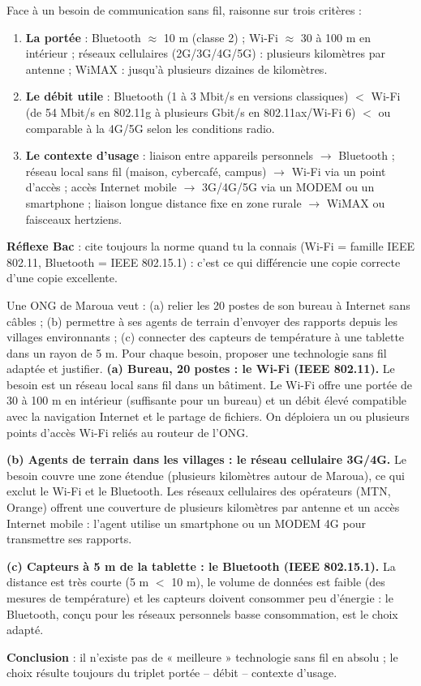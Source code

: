 \documentclass[11pt]{article}
\newcommand{\cle}[1]{{\popxbold\color{popdark}#1}}
\begin{document}
\begin{methode}
Face à un besoin de communication sans fil, raisonne sur trois critères :
\begin{enumerate}
\item \textbf{La portée} : Bluetooth $\approx$ 10 m (classe 2) ; Wi-Fi $\approx$ 30 à 100 m en intérieur ; réseaux cellulaires (2G/3G/4G/5G) : plusieurs kilomètres par antenne ; WiMAX : jusqu'à plusieurs dizaines de kilomètres.
\item \textbf{Le débit utile} : Bluetooth (1 à 3 Mbit/s en versions classiques) $<$ Wi-Fi (de 54 Mbit/s en 802.11g à plusieurs Gbit/s en 802.11ax/Wi-Fi 6) $<$ ou comparable à la 4G/5G selon les conditions radio.
\item \textbf{Le contexte d'usage} : liaison entre appareils personnels $\rightarrow$ Bluetooth ; réseau local sans fil (maison, cybercafé, campus) $\rightarrow$ Wi-Fi via un point d'accès ; accès Internet mobile $\rightarrow$ 3G/4G/5G via un MODEM ou un smartphone ; liaison longue distance fixe en zone rurale $\rightarrow$ WiMAX ou faisceaux hertziens.
\end{enumerate}
\textbf{Réflexe Bac} : cite toujours la norme quand tu la connais (Wi-Fi = famille IEEE 802.11, Bluetooth = IEEE 802.15.1) : c'est ce qui différencie une copie correcte d'une copie excellente.
\end{methode}

\begin{exoresolu}
Une ONG de Maroua veut : (a) relier les 20 postes de son bureau à Internet sans câbles ; (b) permettre à ses agents de terrain d'envoyer des rapports depuis les villages environnants ; (c) connecter des capteurs de température à une tablette dans un rayon de 5 m. Pour chaque besoin, proposer une technologie sans fil adaptée et justifier.
\tcblower
\textbf{(a) Bureau, 20 postes : le Wi-Fi (IEEE 802.11).} Le besoin est un réseau local sans fil dans un bâtiment. Le Wi-Fi offre une portée de 30 à 100 m en intérieur (suffisante pour un bureau) et un débit élevé compatible avec la navigation Internet et le partage de fichiers. On déploiera un ou plusieurs \cle{points d'accès} Wi-Fi reliés au routeur de l'ONG.

\textbf{(b) Agents de terrain dans les villages : le réseau cellulaire 3G/4G.} Le besoin couvre une zone étendue (plusieurs kilomètres autour de Maroua), ce qui exclut le Wi-Fi et le Bluetooth. Les réseaux cellulaires des opérateurs (MTN, Orange) offrent une couverture de plusieurs kilomètres par antenne et un accès Internet mobile : l'agent utilise un smartphone ou un MODEM 4G pour transmettre ses rapports.

\textbf{(c) Capteurs à 5 m de la tablette : le Bluetooth (IEEE 802.15.1).} La distance est très courte (5 m $<$ 10 m), le volume de données est faible (des mesures de température) et les capteurs doivent consommer peu d'énergie : le Bluetooth, conçu pour les réseaux personnels basse consommation, est le choix adapté.

\textbf{Conclusion} : il n'existe pas de « meilleure » technologie sans fil en absolu ; le choix résulte toujours du triplet portée -- débit -- contexte d'usage.
\end{exoresolu}
\end{document}
